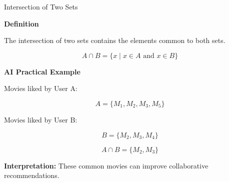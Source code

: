 \documentclass[aspectratio=169]{beamer}
\begin{document}
\begin{frame}{Intersection of Two Sets}

\textbf{Definition}

The intersection of two sets contains the elements common to both sets.

\[
A\cap B=\{x\mid x\in A \text{ and } x\in B\}
\]

\vspace{0.3cm}

\textbf{AI Practical Example}

Movies liked by User A:

\[
A=\{M_1,M_2,M_3,M_5\}
\]

Movies liked by User B:

\[
B=\{M_2,M_3,M_4\}
\]

\[
A\cap B=\{M_2,M_3\}
\]

\textbf{Interpretation:} These common movies can improve collaborative recommendations.

\end{frame}
\end{document}

